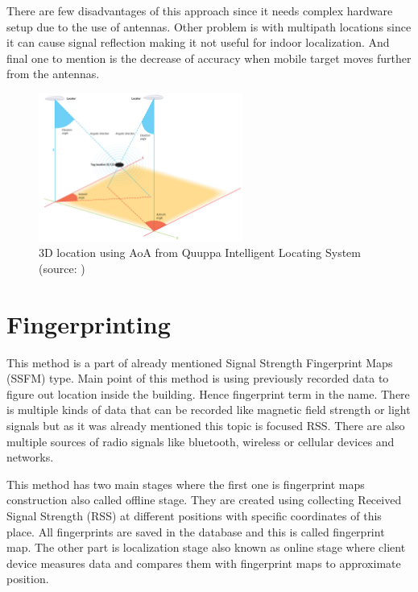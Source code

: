There are few disadvantages of this approach since it needs complex hardware setup due to the use of antennas. Other problem is with multipath locations since it can cause signal reflection making it not useful for indoor localization. And final one to mention is the decrease of accuracy when mobile target moves further from the antennas.\cite{AoA}\cite{RofAoA}

\begin{figure}[h!]
	\begin{centering}
		\includegraphics[width=0.6\textwidth]{img/angulation}
		\par\end{centering}
	\caption{3D location using AoA from Quuppa Intelligent Locating System (source: \cite{QAoA})\label{fig:AoAQuuppa}}
	\label{fig4}
\end{figure}

\section{Fingerprinting}\label{sec:Fingerprinting}
This method is a part of already mentioned Signal Strength Fingerprint Maps (SSFM) type. Main point of this method is using previously recorded data to figure out location inside the building. Hence fingerprint term in the name. There is multiple kinds of data that can be recorded like magnetic field strength or light signals but as it was already mentioned this topic is focused RSS. There are also multiple sources of radio signals like bluetooth, wireless or cellular devices and networks.

This method has two main stages where the first one is fingerprint maps construction also called offline stage. They are created using collecting Received Signal Strength (RSS) at different positions with specific coordinates of this place. All fingerprints are saved in the database and this is called fingerprint map. The other part is localization stage also known as online stage where client device measures data and compares them with fingerprint maps to approximate position. \cite{LocalizationApproaches}\cite{IndoorLocalizationWithoutThePain}

